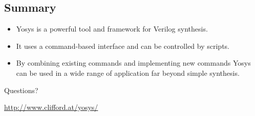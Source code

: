 
\subsection{Summary}

\begin{frame}{\subsecname}
\begin{itemize}
\item Yosys is a powerful tool and framework for Verilog synthesis.
\item It uses a command-based interface and can be controlled by scripts.
\item By combining existing commands and implementing new commands Yosys can
be used in a wide range of application far beyond simple synthesis.
\end{itemize}

\bigskip
\bigskip
\begin{center}
Questions?
\end{center}

\bigskip
\bigskip
\begin{center}
\url{http://www.clifford.at/yosys/}
\end{center}
\end{frame}

